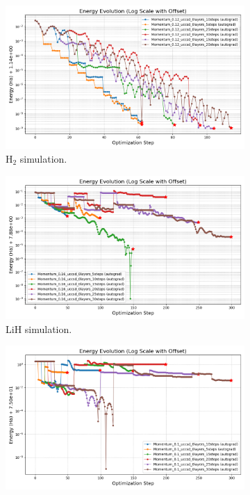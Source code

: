 \begin{figure}[H]
  \centering
  \begin{subfigure}{0.45\textwidth}
    \includegraphics[width=\textwidth]{data/NumIterations/results_H2/energy_evolution_log_offset.png}
    \caption{H$_2$ simulation.}
    \label{fig:num_iterations_h2}
  \end{subfigure}
  \begin{subfigure}{0.45\textwidth}
    \includegraphics[width=\textwidth]{data/NumIterations/results_LiH/energy_evolution_log_offset.png}
    \caption{LiH simulation.}
    \label{fig:num_iterations_lih}
  \end{subfigure}
  \begin{subfigure}{0.45\textwidth}
    \includegraphics[width=\textwidth]{data/NumIterations/results_H2O/energy_evolution_log_offset.png}

\end{subfigure}
\end{figure}
